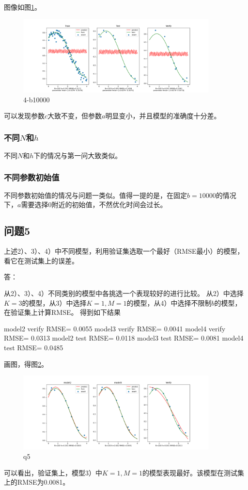 图像如图\ref{fig:4-b10000}。
\begin{figure}[H]
   \begin{center}
       \includegraphics[width=0.9\textwidth]{img/4-b10000.png}
   \end{center}
  \caption[]{4-b10000}
   \label{fig:4-b10000}
\end{figure} 

可以发现参数$c$大致不变，但参数$a$明显变小，并且模型的准确度十分差。

\subsubsection{不同$N$和$h$}

不同$N$和$h$下的情况与第一问大致类似。

\subsubsection{不同参数初始值}

不同参数初始值的情况与问题一类似。值得一提的是，在固定$b=10000$的情况下，$a$需要选择0附近的初始值，不然优化时间会过长。


 \subsection{问题5}

 上述2）、3）、4）中不同模型，利用验证集选取一个最好（RMSE最小）的模型，看它在测试集上的误差。

 答：

 从2）、3）、4）不同类别的模型中各挑选一个表现较好的进行比较。
 从2）中选择$K=3$的模型，从3）中选择$K=1,M=1$的模型，从4）中选择不限制$b$的模型，在验证集上计算RMSE。
 得到如下结果
\begin{python}
model2 verify RMSE= 0.0055
model3 verify RMSE= 0.0041
model4 verify RMSE= 0.0313
model2 test RMSE= 0.0118
model3 test RMSE= 0.0081
model4 test RMSE= 0.0485
\end{python}

 画图，得图\ref{fig:q5}。

 \begin{figure}[H]
    \begin{center}
        \includegraphics[width=0.9\textwidth]{img/5.png}
    \end{center}
   \caption[]{q5}
    \label{fig:q5}
 \end{figure} 

 可以看出，验证集上，模型3）中$K=1,M=1$的模型表现最好。该模型在测试集上的RMSE为0.0081。
